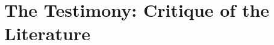 %
%
%
%
%


\section[Literature]{The Testimony: Critique of the Literature} \label{sec:Literature}

